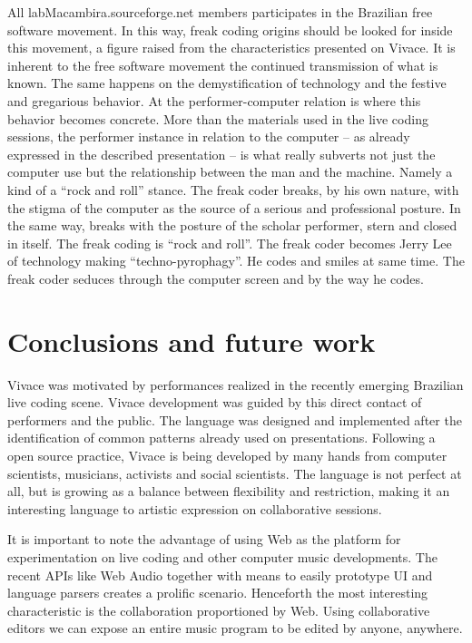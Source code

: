 \documentclass[letterpaper, 12pt]{article}
\begin{document}
All labMacambira.sourceforge.net members participates in the Brazilian
free software movement. In this way, freak coding origins should be
looked for inside this movement, a figure raised from the
characteristics presented on Vivace. It is inherent to the free
software movement the continued transmission of what is known. The
same happens on the demystification of technology and the festive and
gregarious behavior. At the performer-computer relation is where this
behavior becomes concrete. More than the materials used in the live
coding sessions, the performer instance in relation to the computer --
as already expressed in the described presentation -- is what really
subverts not just the computer use but the relationship between the
man and the machine. Namely a kind of a ``rock and roll'' stance. The
freak coder breaks, by his own nature, with the stigma of the computer
as the source of a serious and professional posture. In the same way,
breaks with the posture of the scholar performer, stern and closed in
itself. The freak coding is ``rock and roll''. The freak coder becomes
Jerry Lee of technology making ``techno-pyrophagy''. He codes and
smiles at same time. The freak coder seduces through the computer
screen and by the way he codes.

\section{Conclusions and future work}

Vivace was motivated by performances realized in the recently emerging
Brazilian live coding scene. Vivace development was guided by this
direct contact of performers and the public. The language was designed
and implemented after the identification of common patterns already
used on presentations. Following a open source practice, Vivace is
being developed by many hands from computer scientists, musicians,
activists and social scientists. The language is not perfect at all,
but is growing as a balance between flexibility and restriction,
making it an interesting language to artistic expression on
collaborative sessions.

It is important to note the advantage of using Web as the platform for
experimentation on live coding and other computer music
developments. The recent APIs like Web Audio together with means to
easily prototype UI and language parsers creates a prolific
scenario. Henceforth the most interesting characteristic is the
collaboration proportioned by Web. Using collaborative editors we can
expose an entire music program to be edited by anyone, anywhere.
\end{document}
